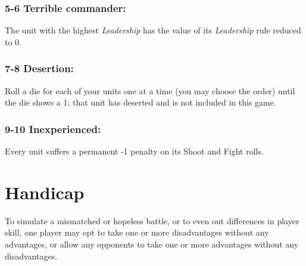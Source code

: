 \begin{multicols}{2}
\subsubsection*{5-6 Terrible commander:} The unit with the highest \textit{Leadership} has the value of its \textit{Leadership} rule reduced to 0.

\subsubsection*{7-8 Desertion:} Roll a die for each of your units one at a time (you may choose the order) until the die shows a 1; that unit has deserted and is not included in this game.

\subsubsection*{9-10 Inexperienced:} Every unit suffers a permanent -1 penalty on its Shoot and Fight rolls.




\section*{Handicap}
To simulate a mismatched or hopeless battle, or to even out differences in player skill, one player may opt to take one or more disadvantages without any advantages,  or allow any opponents to take one or more advantages without any disadvantages.

\end{multicols}

